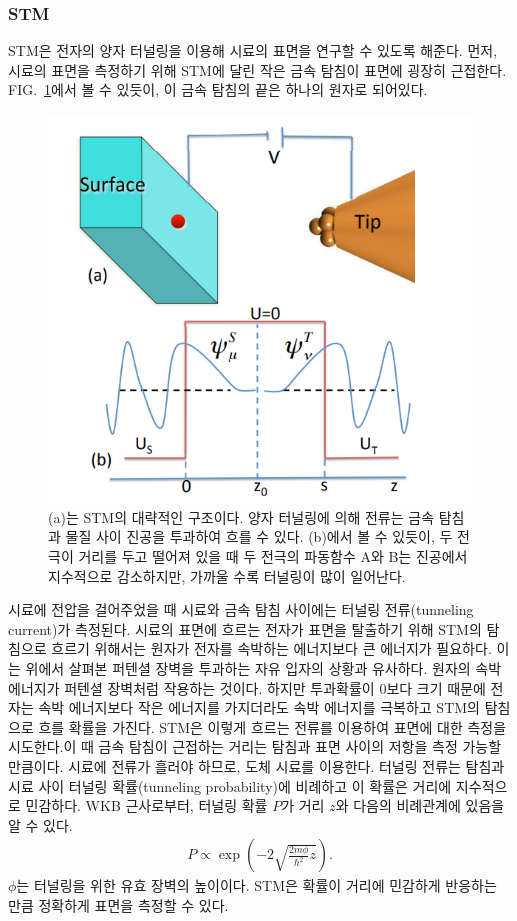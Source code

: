 \documentclass[aps,reprint,superscriptaddress]{revtex4-2}
\begin{document}
\subsubsection{STM}
STM은 전자의 양자 터널링을 이용해 시료의 표면을 연구할 수 있도록 해준다.
먼저, 시료의 표면을 측정하기 위해 STM에 달린 작은 금속 탐침이 표면에 굉장히 근접한다. 
FIG.~\ref{fig:2}에서 볼 수 있듯이, 이 금속 탐침의 끝은 하나의 원자로 되어있다. 

\begin{figure}[htp]
  \centering
  \includegraphics[scale=0.35]{STM.png}
  \caption{(a)는 STM의 대략적인 구조이다. 
  양자 터널링에 의해 전류는 금속 탐침과 물질 사이 진공을 투과하여 흐를 수 있다.
  (b)에서 볼 수 있듯이, 두 전극이 거리를 두고 떨어져 있을 때 두 전극의 파동함수 A와 B는
  진공에서 지수적으로 감소하지만, 가까울 수록 터널링이 많이 일어난다.}
  \label{fig:2}
\end{figure}

시료에 전압을 걸어주었을 때 시료와 금속 탐침 사이에는 터널링 전류(tunneling current)가 
측정된다. 시료의 표면에 흐르는 전자가 표면을 탈출하기 위해 STM의 탐침으로 흐르기 위해서는 
원자가 전자를 속박하는 에너지보다 큰 에너지가 필요하다. 이는 위에서 살펴본 퍼텐셜 장벽을 
투과하는 자유 입자의 상황과 유사하다. 원자의 속박 에너지가 퍼텐셜 장벽처럼 작용하는 것이다. 
하지만 투과확률이 $0$보다 크기 때문에 전자는 속박 에너지보다 작은 에너지를 가지더라도 속박 
에너지를 극복하고 STM의 탐침으로 흐를 확률을 가진다. STM은 이렇게 흐르는 전류를 이용하여 
표면에 대한 측정을 시도한다.이 때 금속 탐침이 근접하는 거리는 탐침과 표면 사이의 저항을 측정 
가능할 만큼이다. 시료에 전류가 흘러야 하므로, 도체 시료를 이용한다. 터널링 전류는 탐침과 시료 
사이 터널링 확률(tunneling probability)에 비례하고 이 확률은 거리에 지수적으로 민감하다. 
WKB 근사로부터, 터널링 확률 $P$가 거리 $z$와 다음의 비례관계에 있음을 알 수 있다.
\begin{align}
   P \propto \exp\left(-2\sqrt{\frac{2m\phi}{\hbar^2}z}\right).
\end{align}
$\phi$는 터널링을 위한 유효 장벽의 높이이다. STM은 확률이 거리에 민감하게 반응하는 만큼
정확하게 표면을 측정할 수 있다.
\end{document}
